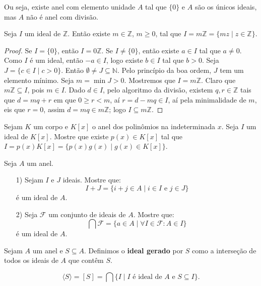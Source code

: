 \documentclass[11pt,twoside,a4paper]{book}
\begin{document}
\noindent
Ou seja, existe anel com elemento unidade $A$ tal que $\{0\}$ e $A$ são os únicos ideais, mas $A$ não é anel com divisão.

\begin{proposicao}
Seja $I$ um ideal de $\mathbb{Z}$. Então existe $m\in\mathbb{Z}$, $m\geq 0$, tal que $I=m\mathbb{Z}=\{mz\mid z\in\mathbb{Z}\}$.
\end{proposicao}
\begin{proof}
Se $I=\{0\}$, então $I=0\mathbb{Z}$. Se $I\neq\{0\}$, então existe $a\in I$ tal que $a\neq 0$. Como $I$ é um ideal, então $-a\in I$, logo existe $b\in I$ tal que $b>0$. Seja $J=\{c\in I\mid c>0\}$. Então $\emptyset\neq J\subseteq\mathbb{N}$. Pelo princípio da boa ordem, $J$ tem um elemento mínimo. Seja $m=\min J>0$. Mostremos que $I=m\mathbb{Z}$. Claro que $m\mathbb{Z}\subseteq I$, pois $m\in I$. Dado $d\in I$, pelo algoritmo da divisão, existem $q,r\in\mathbb{Z}$ tais que $d=mq+r$ em que $0\geq r<m$, aí $r=d-mq\in I$, aí pela minimalidade de $m$, eis que $r=0$, assim $d=mq\in m\mathbb{Z}$; logo $I\subseteq m\mathbb{Z}$.
\end{proof}

\begin{exercicio}
Sejam $K$ um corpo e $K[x]$ o anel dos polinômios na indeterminada $x$. Seja $I$ um ideal de $K[x]$. Mostre que existe $p(x)\in K[x]$ tal que $I=p(x)K[x]=\{p(x)g(x)\mid g(x)\in K[x]\}$.
\end{exercicio}

\begin{exercicio}
Seja $A$ um anel.
\begin{itemize}
\item[1)] Sejam $I$ e $J$ ideais. Mostre que:
\[
I+J=\{i+j\in A\mid i\in I\text{ e }j\in J\}
\]
é um ideal de $A$.
\item[2)] Seja $\mathcal{F}$ um conjunto de ideais de $A$. Mostre que:
\[
\bigcap\mathcal{F}=\{a\in A\mid \forall I\in\mathcal{F}:A\in I\}
\]
é um ideal de $A$.
\end{itemize}
\end{exercicio}

\begin{definicao}
Sejam $A$ um anel e $S\subseteq A$. Definimos o \textbf{ideal gerado} por $S$ como a interseção de todos os ideais de $A$ que contêm $S$.
\end{definicao}

\begin{notacao}
\[
\langle S \rangle = [S]=\bigcap \{I\mid I\text{ é ideal de }A\text{ e }S\subseteq I\}.
\]
\end{notacao}
\end{document}
